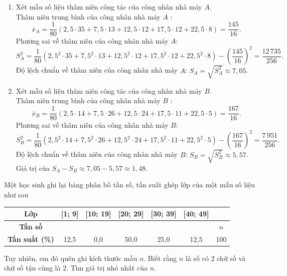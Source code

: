 \begin{ex}
{\begin{enumerate}[$\bullet$]
			\item Xét mẫu số liệu thâm niên công tác của công nhân nhà máy $A$.\\
			Thâm niên trung bình của công nhân nhà máy $A$ :
			$$\overline{x}_A=\dfrac{1}{80}\left(2{,}5\cdot 35+7{,}5\cdot 13+12{,}5\cdot 12+17{,}5\cdot 12+22{,}5\cdot8\right)=\dfrac{145}{16}.$$
			Phương sai về thâm niên của công nhân nhà máy $A$: $$S_A^2=\dfrac{1}{80}\left(2{,}5^2\cdot 35+7{,}5^2\cdot 13+12{,}5^2\cdot 12+17{,}5^2\cdot 12+22{,}5^2\cdot8\right)-\left(\dfrac{145}{16}\right)^2 =\dfrac{12\,735}{256}.$$
			Độ lệch chuẩn  về thâm niên của công nhân nhà máy $A$: $S_A=\sqrt{S_A^2}\approx 7{,}05$.
			\item Xét mẫu số liệu thâm niên công tác của công nhân nhà máy $B$.\\
			Thâm niên trung bình của công nhân nhà máy $B$ :
			$$\overline{x}_B=\dfrac{1}{80}\left(2{,}5\cdot 14+7{,}5\cdot 26+12{,}5\cdot 24+17{,}5\cdot 11+22{,}5\cdot5\right)=\dfrac{167}{16}.$$
			Phương sai về thâm niên của công nhân nhà máy $B$: $$S_B^2=\dfrac{1}{80}\left(2{,}5^2\cdot 14+7{,}5^2\cdot 26+12{,}5^2\cdot 24+17{,}5^2\cdot 11+22{,}5^2\cdot 5\right)-\left(\dfrac{167}{16}\right)^2 =\dfrac{7\,951}{256}.$$
			Độ lệch chuẩn  về thâm niên của công nhân nhà máy $B$: $S_B=\sqrt{S_B^2}\approx 5{,}57$.\\
			Giá trị của $S_A-S_B\approx 7{,}05-5{,}57\approx 1{,}48$.
		\end{enumerate}
	}
\end{ex}

\begin{ex}%
Một học sinh ghi lại bảng phân bố tần số, tần suất ghép lớp của một mẫu số liệu như sau
\begin{center}
	\begin{tabular}{|c|c|c|c|c|c|c|}
		\hline
		\bf Lớp  & [1; 9] & [10; 19] & [20; 29] & [30; 39] & [40; 49] & \\
		\hline
		\bf Tần số & & & & & & $n$\\
		\hline
		\bf Tần suất (\%) & 12{,}5 & 0{,}0 & 50{,}0 & 25{,}0 & 12{,}5 & 100\\
		\hline
	\end{tabular}
\end{center}
Tuy nhiên, em đó quên ghi kích thước mẫu $n$. Biết rằng $n$ là số có $2$ chữ số và chữ số tận cùng là $2$. Tìm giá trị nhỏ nhất của $n$.
\end{ex}

